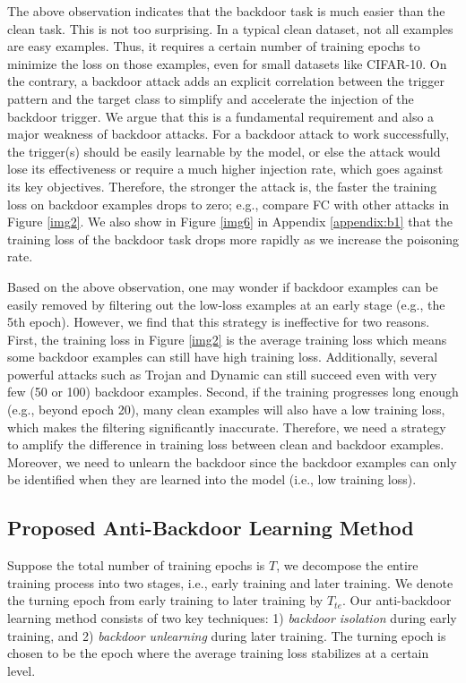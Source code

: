 The above observation indicates that the backdoor task is much easier than the clean task. This is not too surprising. In a typical clean dataset, not all examples are easy examples. Thus, it requires a certain number of training epochs to minimize the loss on those examples, even for small datasets like CIFAR-10. On the contrary, a backdoor attack adds an explicit correlation between the trigger pattern and the target class to simplify and accelerate the injection of the backdoor trigger. We argue that this is a fundamental requirement and also a major weakness of backdoor attacks. For a backdoor attack to work successfully, the trigger(s) should be easily learnable by the model, or else the attack would lose its effectiveness or require a much higher injection rate, which goes against its key objectives. 
Therefore, the stronger the attack is, the faster the training loss on backdoor examples drops to zero; e.g., compare FC with other attacks in Figure \ref{img2}. We also show in Figure \ref{img6} in Appendix \ref{appendix:b1} that the training loss of the backdoor task drops more rapidly as we increase the poisoning rate.

Based on the above observation, one may wonder if backdoor examples can be easily removed by filtering out the low-loss examples at an early stage (e.g., the 5th epoch). However, we find that this strategy is ineffective for two reasons. First, the training loss in Figure \ref{img2} is the average training loss which means some backdoor examples can still have high training loss. Additionally, several powerful attacks such as Trojan and Dynamic can still succeed even with very few (50 or 100) backdoor examples. Second, if the training progresses long enough (e.g., beyond epoch 20), many clean examples will also have a low training loss, which makes the filtering significantly inaccurate. 
Therefore, we need a strategy to amplify the difference in training loss between clean and backdoor examples. Moreover, we need to unlearn the backdoor since the backdoor examples can only be identified when they are learned into the model (i.e., low training loss).

\subsection{Proposed Anti-Backdoor Learning Method}
Suppose the total number of training epochs is $T$, we decompose the entire training process into two stages, i.e., early training and later training. We denote the turning epoch from early training to later training by $T_{te}$. Our anti-backdoor learning method consists of two key techniques: 1) \emph{backdoor isolation} during early training, and 2) \emph{backdoor unlearning} during later training. The turning epoch is chosen to be the epoch where the average training loss stabilizes at a certain level.

